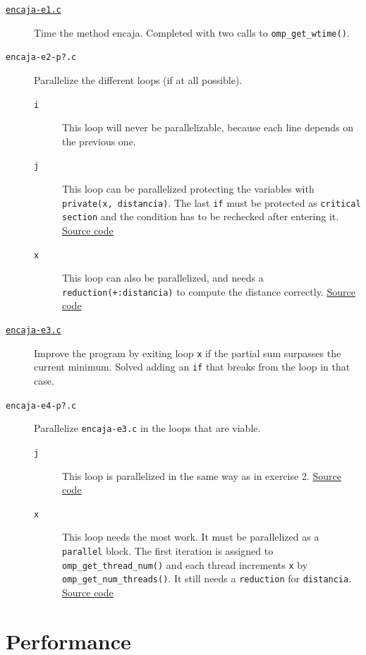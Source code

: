 \documentclass[a4paper]{article}
\newcommand{\github}{https://github.com/kauron/etsinf3/tree/master/CPA/lab2}
\begin{document}
\begin{description}
    \item [\texttt{\href{\github /src/encaja-e1.c\#L167}{encaja-e1.c}}] Time the method encaja. Completed with two calls to \texttt{omp\_get\_wtime()}.
    \item [\texttt{encaja-e2-p?.c}] Parallelize the different loops (if at all possible).
    \begin{description}
        \item [\texttt{i}] This loop will never be parallelizable, because each line depends on the previous one.
        \item [\texttt{j}] This loop can be parallelized protecting the variables with \texttt{private(x, distancia)}. The last \texttt{if} must be protected as \texttt{critical section} and the condition has to be rechecked after entering it. \href{\github /src/encaja-e2-pJ.c\#L118}{Source code}
        \item [\texttt{x}] This loop can also be parallelized, and needs a \texttt{reduction(+:distancia)} to compute the distance correctly. \href{\github /src/encaja-e2-pX.c\#L120}{Source code}
    \end{description}
    \item [\texttt{\href{\github /src/encaja-e3.c\#L122}{encaja-e3.c}}] Improve the program by exiting loop \texttt{x} if the partial sum surpasses the current minimum. Solved adding an \texttt{if} that breaks from the loop in that case.
    \item [\texttt{encaja-e4-p?.c}] Parallelize \texttt{encaja-e3.c} in the loops that are viable.
    \begin{description}
        \item [\texttt{j}] This loop is parallelized in the same way as in exercise 2. \href{\github /src/encaja-e4-pJ.c\#L118}{Source code}
        \item [\texttt{x}] This loop needs the most work. It must be parallelized as a \texttt{parallel} block. The first iteration is assigned to \texttt{omp\_get\_thread\_num()} and each thread increments \texttt{x} by \texttt{omp\_get\_num\_threads()}. It still needs a \texttt{reduction} for \texttt{distancia}. \href{\github /src/encaja-e4-pX.c}{Source code}
    \end{description}
\end{description}

\section{Performance}
\end{document}
